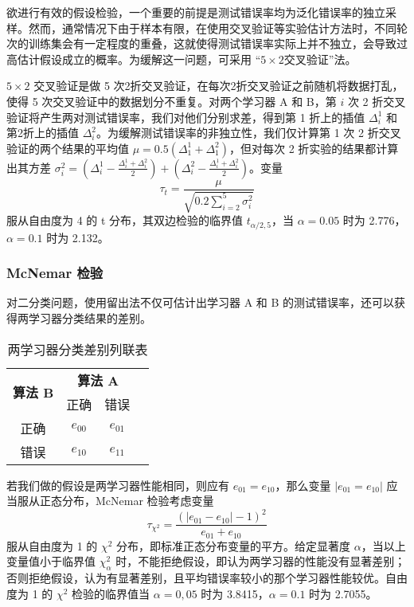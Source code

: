 欲进行有效的假设检验，一个重要的前提是测试错误率均为泛化错误率的独立采样。然而，通常情况下由于样本有限，在使用交叉验证等实验估计方法时，不同轮次的训练集会有一定程度的重叠，这就使得测试错误率实际上并不独立，会导致过高估计假设成立的概率。为缓解这一问题，可采用 ``$5\times 2$交叉验证''法。

$5\times 2$ 交叉验证是做 5 次2折交叉验证，在每次2折交叉验证之前随机将数据打乱，使得 5 次交叉验证中的数据划分不重复。对两个学习器 A 和 B，第 $i$ 次 2 折交叉验证将产生两对测试错误率，我们对他们分别求差，得到第 1 折上的插值 $\Delta_i^1$ 和第2折上的插值 $\Delta_i^2$。为缓解测试错误率的非独立性，我们仅计算第 1 次 2 折交叉验证的两个结果的平均值 $\mu = 0.5(\Delta_1^1 + \Delta_1^2)$，但对每次 2 折实验的结果都计算出其方差 $\sigma_i^2 = \left( \Delta_i^1 - \frac{\Delta_i^1 + \Delta_i^2}{2} \right) + \left( \Delta_i^2 - \frac{\Delta_i^1 + \Delta_i^2}{2} \right)$。变量
\begin{equation}
    \tau_t = \frac{\mu}{\sqrt{0.2\sum_{i=2}^5 \sigma_i^2}}
\end{equation}
服从自由度为 4 的 t 分布，其双边检验的临界值 $t_{\alpha/2,5}$，当 $\alpha = 0.05$ 时为 2.776，$\alpha = 0.1$ 时为 2.132。

\subsubsection{McNemar 检验}

对二分类问题，使用留出法不仅可估计出学习器 A 和 B 的测试错误率，还可以获得两学习器分类结果的差别。

\begin{table}[H]
    \centering
    \caption{两学习器分类差别列联表}
    \label{table:两学习器分类差别列联表}
    \setlength{\tabcolsep}{7mm}
    \begin{tabular}{c|c|cc}
        \toprule
        \multirow{2}{*}{\textbf{算法 B}} & \multicolumn{2}{c}{\textbf{算法 A}}  \\ 
        \cline{2-3}
        & 正确 & 错误 \\
        \midrule
        正确 & $e_{00}$ & $e_{01}$  \\
        错误 & $e_{10}$ & $e_{11}$  \\
        \bottomrule
    \end{tabular}
\end{table}

若我们做的假设是两学习器性能相同，则应有 $e_{01} = e_{10}$，那么变量 $|e_{01} = e_{10}|$ 应当服从正态分布，McNemar 检验考虑变量
\begin{equation}
    \tau_{\chi^2} = \frac{(|e_{01}-e_{10}|-1)^2}{e_{01}+e_{10}}
\end{equation}
服从自由度为 1 的 $\chi^2$ 分布，即标准正态分布变量的平方。给定显著度 $\alpha$，当以上变量值小于临界值 $\chi_{\alpha}^2$ 时，不能拒绝假设，即认为两学习器的性能没有显著差别；否则拒绝假设，认为有显著差别，且平均错误率较小的那个学习器性能较优。自由度为 1 的 $\chi^2$ 检验的临界值当 $\alpha = 0,05$ 时为 3.8415，$\alpha=0.1$ 时为 2.7055。
